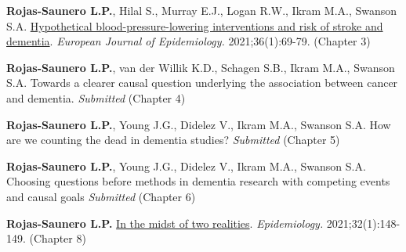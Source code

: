 \textbf{Rojas-Saunero L.P.}, Hilal S., Murray E.J., Logan R.W., Ikram
M.A., Swanson S.A.
\href{https://pubmed.ncbi.nlm.nih.gov/33247419/}{Hypothetical
blood-pressure-lowering interventions and risk of stroke and dementia}.
\emph{European Journal of Epidemiology.} 2021;36(1):69-79. (Chapter 3)

\textbf{Rojas-Saunero L.P.}, van der Willik K.D., Schagen S.B., Ikram
M.A., Swanson S.A. Towards a clearer causal question underlying the
association between cancer and dementia. \emph{Submitted} (Chapter 4)

\textbf{Rojas-Saunero L.P.}, Young J.G., Didelez V., Ikram M.A., Swanson
S.A. How are we counting the dead in dementia studies? \emph{Submitted}
(Chapter 5)

\textbf{Rojas-Saunero L.P.}, Young J.G., Didelez V., Ikram M.A., Swanson
S.A. Choosing questions before methods in dementia research with
competing events and causal goals \emph{Submitted} (Chapter 6)

\textbf{Rojas-Saunero L.P.}
\href{https://pubmed.ncbi.nlm.nih.gov/33122553/}{In the midst of two
realities}. \emph{Epidemiology.} 2021;32(1):148-149. (Chapter 8)

\newpage
\thispagestyle{empty}
\tableofcontents

